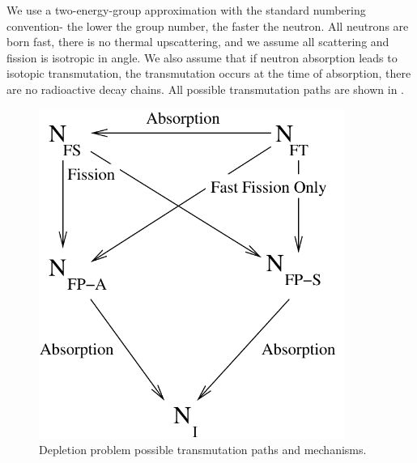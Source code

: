 We use a two-energy-group approximation with the standard numbering convention- the lower the group number, the faster the neutron.  
All neutrons are born fast, there is no thermal upscattering, and we assume all scattering and fission is isotropic in angle.
We also assume that if neutron absorption leads to isotopic transmutation, the transmutation occurs at the time of absorption, there are no radioactive decay chains.
All possible transmutation paths are shown in .
\begin{figure}[!htp]
\begin{center}
\includegraphics[width=10cm]{chapter5_depletion/article_transmutation.pdf}
\end{center}
\caption{Depletion problem possible transmutation paths and mechanisms.}
\label{fig:transmutation}
\end{figure}

